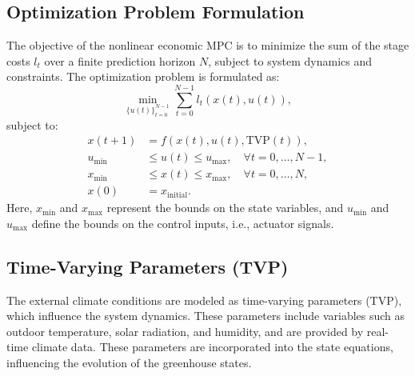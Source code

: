 \documentclass[conference]{IEEEtran}
\begin{document}
\subsection{Optimization Problem Formulation}

The objective of the nonlinear economic MPC is to minimize the sum of the stage costs \(l_t\) over a finite prediction horizon \(N\), subject to system dynamics and constraints. The optimization problem is formulated as:
\begin{equation}
	\min_{\{u(t)\}_{t=0}^{N-1}} \sum_{t=0}^{N-1} l_t(x(t), u(t)),
\end{equation}
subject to:
\begin{align}
	x(t+1) &= f(x(t), u(t), \text{TVP}(t)), \\
	u_{\min} &\leq u(t) \leq u_{\max}, \quad \forall t = 0, \dots, N-1, \\
	x_{\min} &\leq x(t) \leq x_{\max}, \quad \forall t = 0, \dots, N, \\
	x(0) &= x_{\text{initial}}.
\end{align}
Here, \(x_{\min}\) and \(x_{\max}\) represent the bounds on the state variables, and \(u_{\min}\) and \(u_{\max}\) define the bounds on the control inputs, i.e., actuator signals.

\subsection{Time-Varying Parameters (TVP)}

The external climate conditions are modeled as time-varying parameters (TVP), which influence the system dynamics. These parameters include variables such as outdoor temperature, solar radiation, and humidity, and are provided by real-time climate data. These parameters are incorporated into the state equations, influencing the evolution of the greenhouse states.
\end{document}
